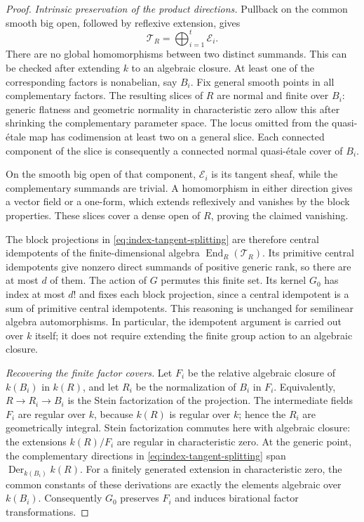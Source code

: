\begin{proof}
\emph{Intrinsic preservation of the product directions.}
Pullback on the common smooth big open, followed by reflexive
extension, gives
\begin{equation}\label{eq:index-tangent-splitting}
                         \mathcal T_R=\bigoplus_{i=1}^t\mathcal E_i.
\end{equation}
There are no global homomorphisms between two distinct summands.
This can be checked after extending $k$ to an algebraic closure.
At least one of the corresponding factors is nonabelian,
say $B_i$. Fix general smooth points in all complementary factors.
The resulting slices of $R$ are normal and finite over $B_i$:
generic flatness and geometric normality in characteristic zero
allow this after shrinking the complementary parameter space.
The locus omitted from the quasi-\'etale map has codimension at
least two on a general slice. Each connected component of the
slice is consequently a connected normal quasi-\'etale cover
of $B_i$.

On the smooth big open of that component, $\mathcal E_i$ is its
tangent sheaf, while the complementary summands are trivial.
A homomorphism in either direction gives a vector field or a
one-form, which extends reflexively and vanishes by the block
properties. These slices cover a dense open of $R$, proving
the claimed vanishing.

The block projections in \eqref{eq:index-tangent-splitting} are
therefore central idempotents of the finite-dimensional algebra
$\operatorname{End}_R(\mathcal T_R)$. Its primitive central
idempotents give nonzero direct summands of positive generic
rank, so there are at most $d$ of them. The action of $G$
permutes this finite set. Its kernel $G_0$ has index at most
$d!$ and fixes each block projection, since a central idempotent
is a sum of primitive central idempotents. This reasoning is
unchanged for semilinear algebra automorphisms. In particular, the
idempotent argument is carried out over $k$ itself; it does not
require extending the finite group action to an algebraic closure.

\emph{Recovering the finite factor covers.}
Let $F_i$ be the relative algebraic closure of $k(B_i)$ in $k(R)$,
and let $R_i$ be the normalization of $B_i$ in $F_i$. Equivalently,
$R\to R_i\to B_i$ is the Stein factorization of the projection.
The intermediate fields $F_i$ are regular over $k$, because
$k(R)$ is regular over $k$; hence the $R_i$ are geometrically
integral. Stein factorization commutes here with algebraic closure:
the extensions $k(R)/F_i$ are regular in characteristic zero.
At the generic point, the complementary directions in
\eqref{eq:index-tangent-splitting} span
$\operatorname{Der}_{k(B_i)}k(R)$. For a finitely generated
extension in characteristic zero, the common constants of these
derivations are exactly the elements algebraic over $k(B_i)$.
Consequently $G_0$ preserves $F_i$ and induces birational factor
transformations.


\end{proof}

